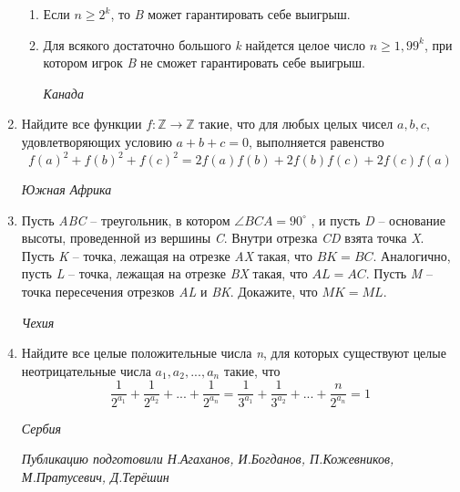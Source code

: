 \begin{multicols}{2}
\begin{enumerate}
        \begin{enumerate}
            \item Если $n \geq 2^k$, то \textit{B} может гарантировать себе выигрыш.
            \item Для всякого достаточно большого \textit{k} найдется целое число $n \geq 1,99^k$, при котором игрок \textit{B} не сможет гарантировать себе выигрыш. \par\hfill \textit{Канада}
        \end{enumerate}
        \item Найдите все функции $f: \mathbb{Z} \to \mathbb{Z}$ такие, что для любых целых чисел $a, b, c$, удовлетворяющих условию $a + b + c = 0$, выполняется равенство
            \begin{equation*}
                f(a)^2+f(b)^2+f(c)^2=2f(a)f(b)+2f(b)f(c)+2f(c)f(a)
            \end{equation*}
            \par\hfill \textit{Южная Африка}
        \item Пусть \textit{ABC} – треугольник, в котором $\angle BCA = 90^\circ$ , и пусть \textit{D} – основание высоты, проведенной из вершины \textit{C}. Внутри отрезка \textit{CD} взята точка \textit{X}. Пусть \textit{K} – точка, лежащая на отрезке \textit{AX} такая, что $BK = BC$. Аналогично, пусть \textit{L} – точка, лежащая на отрезке \textit{BX} такая, что $AL = AC$. Пусть \textit{M} – точка пересечения отрезков \textit{AL} и \textit{BK}. Докажите, что $MK = ML$.\par\hfill \textit{Чехия}
        \item Найдите все целые положительные числа \textit{n}, для которых существуют целые неотрицательные числа $a_1, a_2, ..., a_n$ такие, что
            \begin{equation*}
                \frac{1}{2^{a_1}} + \frac{1}{2^{a_2}} + ... + \frac{1}{2^{a_n}} = \frac{1}{3^{a_1}} + \frac{1}{3^{a_2}} + ... + \frac{n}{2^{a_n}} = 1
            \end{equation*}
            \par\hfill \textit{Сербия}
            \par\raggedleft \textit{Публикацию подготовили Н.Агаханов, И.Богданов, П.Кожевников, М.Пратусевич, Д.Терёшин}
    \end{enumerate}
    \end{multicols}
